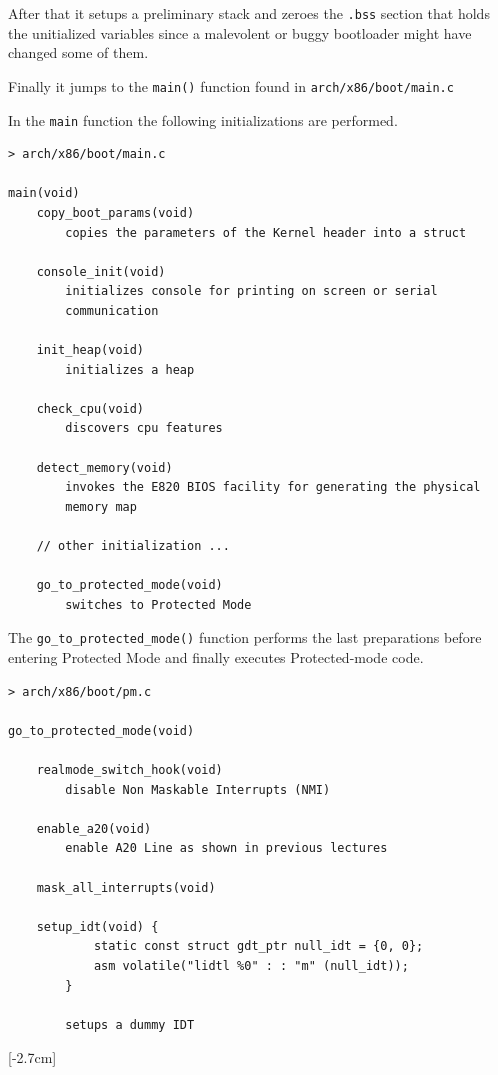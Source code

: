 \documentclass[twoside]{article}
\renewcommand{\cite}[1]{[#1]}
\begin{document}
After that \marginnote{\cite{linin}} it setups a preliminary stack and zeroes the \texttt{.bss} section that holds the unitialized variables since a malevolent or buggy bootloader might have changed some of them.

Finally it jumps to the \texttt{main()} function found in \texttt{arch/x86/boot/main.c}

In the \texttt{main} function  the following initializations are performed.


\begin{verbatim}
> arch/x86/boot/main.c

main(void)
    copy_boot_params(void)
        copies the parameters of the Kernel header into a struct

    console_init(void)
        initializes console for printing on screen or serial
        communication

    init_heap(void)
        initializes a heap

    check_cpu(void)
        discovers cpu features

    detect_memory(void)
        invokes the E820 BIOS facility for generating the physical
        memory map

    // other initialization ...

    go_to_protected_mode(void)
        switches to Protected Mode
\end{verbatim}

The \texttt{go_to_protected_mode()} function  performs the last preparations before entering Protected Mode and finally executes Protected-mode code.

\begin{verbatim}
> arch/x86/boot/pm.c

go_to_protected_mode(void)

    realmode_switch_hook(void)
        disable Non Maskable Interrupts (NMI)

    enable_a20(void)
        enable A20 Line as shown in previous lectures

    mask_all_interrupts(void)

    setup_idt(void) {
            static const struct gdt_ptr null_idt = {0, 0};
            asm volatile("lidtl %0" : : "m" (null_idt));
        }
        
        setups a dummy IDT
\end{verbatim}

[-2.7cm]
\end{document}
